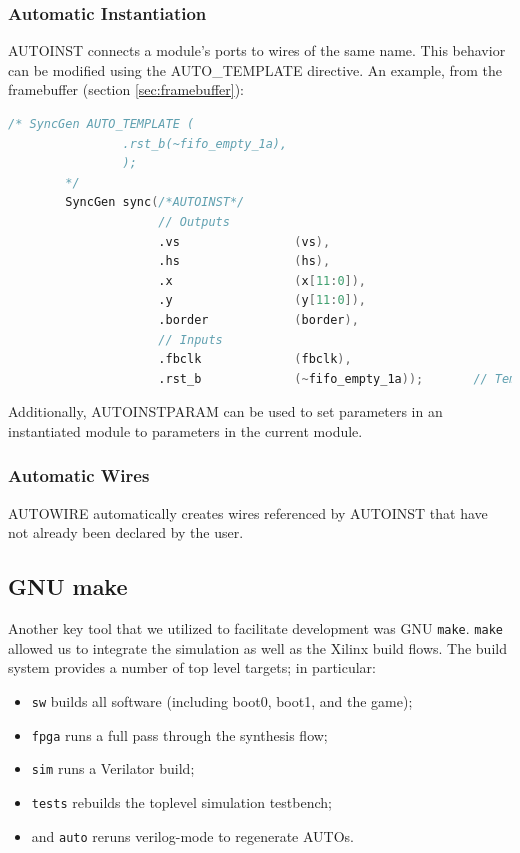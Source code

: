 \documentclass[10pt]{article}
\begin{document}
\subsubsection{Automatic Instantiation}

AUTOINST connects a module's ports to wires of the same name. This behavior
can be modified using the AUTO\_TEMPLATE directive. An example, from the
framebuffer (section \ref{sec:framebuffer}):

\begin{lstlisting}[basicstyle=\footnotesize,language=Verilog]
        /* SyncGen AUTO_TEMPLATE (
                .rst_b(~fifo_empty_1a),
                );
        */
        SyncGen sync(/*AUTOINST*/
                     // Outputs
                     .vs                (vs),
                     .hs                (hs),
                     .x                 (x[11:0]),
                     .y                 (y[11:0]),
                     .border            (border),
                     // Inputs
                     .fbclk             (fbclk),
                     .rst_b             (~fifo_empty_1a));       // Templated
\end{lstlisting}

Additionally, AUTOINSTPARAM can be used to set parameters in an instantiated
module to parameters in the current module.

\subsubsection{Automatic Wires}

AUTOWIRE automatically creates wires referenced by AUTOINST that have not
already been declared by the user.

\subsection{GNU make}

\label{sec:build}

Another key tool that we utilized to facilitate development was GNU
\texttt{make}.  \texttt{make} allowed us to integrate the simulation as well
as the Xilinx build flows.  The build system provides a number of top level
targets; in particular:

\begin{itemize}
\item{\texttt{sw} builds all software (including boot0, boot1, and the game);}
\item{\texttt{fpga} runs a full pass through the synthesis flow;}
\item{\texttt{sim} runs a Verilator build;}
\item{\texttt{tests} rebuilds the toplevel simulation testbench;}
\item{and \texttt{auto} reruns verilog-mode to regenerate AUTOs.}
\end{itemize}
\end{document}

